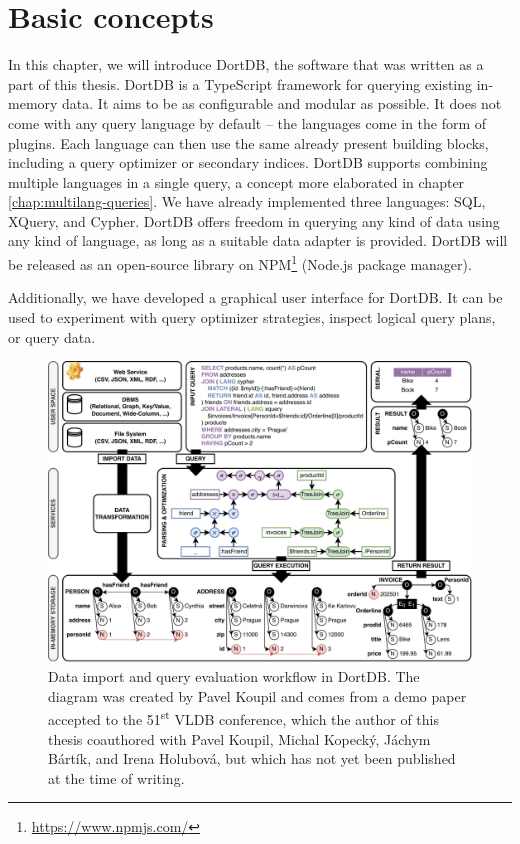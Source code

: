 \chapter{Basic concepts}
\label{chap:basic-concepts}

In this chapter, we will introduce DortDB, the software that was written as a part of this thesis. DortDB is a TypeScript framework for querying existing in-memory data. It aims to be as configurable and modular as possible. It does not come with any query language by default -- the languages come in the form of plugins. Each language can then use the same already present building blocks, including a query optimizer or secondary indices. DortDB supports combining multiple languages in a single query, a concept more elaborated in chapter \ref{chap:multilang-queries}. We have already implemented three languages: SQL, XQuery, and Cypher. DortDB offers freedom in querying any kind of data using any kind of language, as long as a suitable data adapter is provided. DortDB will be released as an open-source library on NPM\footnote{\url{https://www.npmjs.com/}} (Node.js package manager).

Additionally, we have developed a graphical user interface for DortDB. It can be used to experiment with query optimizer strategies, inspect logical query plans, or query data.

\begin{figure}[!h]
    \centering
    \includegraphics[width=\linewidth]{img/dortDB-workflow.pdf}
    \caption{Data import and query evaluation workflow in DortDB. The diagram was created by Pavel Koupil and comes from a demo paper accepted to the 51\textsuperscript{st} VLDB conference, which the author of this thesis coauthored with Pavel Koupil, Michal Kopecký, Jáchym Bártík, and Irena Holubová, but which has not yet been published at the time of writing.}
\end{figure}
